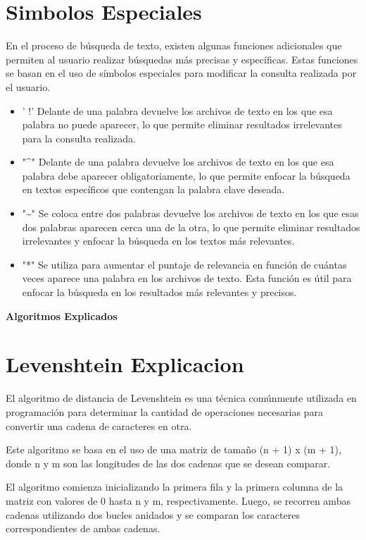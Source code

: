 \documentclass{article}
\begin{document}
\section*{Simbolos Especiales}
En el proceso de búsqueda de texto, existen algunas funciones adicionales que permiten al usuario realizar búsquedas más precisas y específicas. Estas funciones se basan en el uso de símbolos especiales para modificar la consulta realizada por el usuario.
\begin{itemize}
    \item ' !'  Delante de una palabra devuelve los archivos de texto en los que esa palabra no puede aparecer, lo que permite eliminar resultados irrelevantes para la consulta realizada.
    \item  "\^{}"  Delante de una palabra devuelve los archivos de texto en los que esa palabra debe aparecer obligatoriamente, lo que permite enfocar la búsqueda en textos específicos que contengan la palabra clave deseada.
    \item  "\~{}"  Se coloca entre dos palabras devuelve los archivos de texto en los que esas dos palabras aparecen cerca una de la otra, lo que permite eliminar resultados irrelevantes y enfocar la búsqueda en los textos más relevantes.
    \item   "*"  Se utiliza para aumentar el puntaje de relevancia en función de cuántas veces aparece una palabra en los archivos de texto. Esta función es útil para enfocar la búsqueda en los resultados más relevantes y precisos.
\end{itemize}
\begin{center}
    \fontsize{16}{20}\selectfont
    \textbf{Algoritmos Explicados }
\end{center}

\section*{Levenshtein Explicacion}
El algoritmo de distancia de Levenshtein es una técnica comúnmente utilizada en programación para determinar la cantidad de operaciones necesarias para convertir una cadena de caracteres en otra.

Este algoritmo se basa en el uso de una matriz de tamaño (n + 1) x (m + 1), donde n y m son las longitudes de las dos cadenas que se desean comparar.

El algoritmo comienza inicializando la primera fila y la primera columna de la matriz con valores de 0 hasta n y m, respectivamente. Luego, se recorren ambas cadenas utilizando dos bucles anidados y se comparan los caracteres correspondientes de ambas cadenas.
\end{document}
